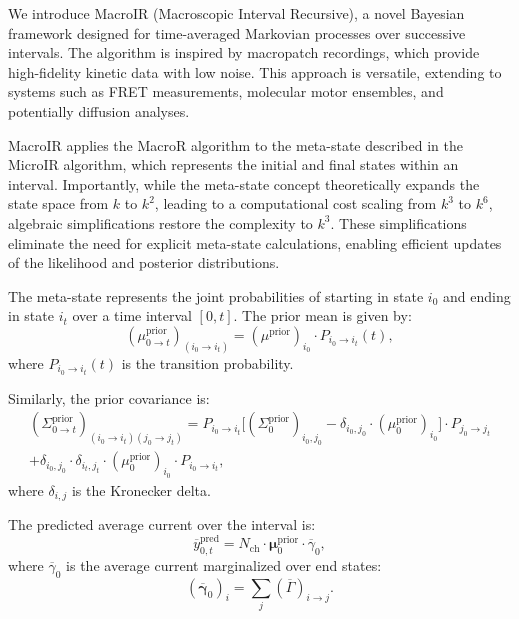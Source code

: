 \documentclass[pdflatex,sn-mathphys-num]{sn-jnl}%
\theoremstyle{thmstyleone}%
\theoremstyle{thmstyletwo}%
\theoremstyle{thmstylethree}%
\begin{document}
We introduce MacroIR (Macroscopic Interval Recursive), a novel Bayesian framework designed for time-averaged Markovian processes over successive intervals. The algorithm is inspired by macropatch recordings, which provide high-fidelity kinetic data with low noise. This approach is versatile, extending to systems such as FRET measurements, molecular motor ensembles, and potentially diffusion analyses.

MacroIR applies the MacroR algorithm to the meta-state described in the MicroIR algorithm, which represents the initial and final states within an interval. Importantly, while the meta-state concept theoretically expands the state space from \( k \) to \( k^2 \), leading to a computational cost scaling from \( k^3 \) to \( k^6 \), algebraic simplifications restore the complexity to \( k^3 \). These simplifications eliminate the need for explicit meta-state calculations, enabling efficient updates of the likelihood and posterior distributions.

The meta-state represents the joint probabilities of starting in state \( i_0 \) and ending in state \( i_t \) over a time interval \( [0, t] \). The prior mean is given by:
\begin{equation}
	(\mu^{\text{prior}}_{0 \rightarrow t})_{(i_0 \rightarrow i_t)} = (\mu^{\text{prior}})_{i_0} \cdot P_{i_0 \rightarrow i_t}(t),
	\label{eq:meta_mean_prior}
\end{equation}
where \( P_{i_0 \rightarrow i_t}(t) \) is the transition probability.

Similarly, the prior covariance is:
\begin{multline}
	(\Sigma^{\text{prior}}_{0 \rightarrow t})_{(i_0 \rightarrow i_t)(j_0 \rightarrow j_t)} = 
	P_{i_0 \rightarrow i_t} \big[(\Sigma^{\text{prior}}_0)_{i_0, j_0} - \delta_{i_0, j_0} \cdot (\mu^{\text{prior}}_0)_{i_0} \big] \cdot P_{j_0 \rightarrow j_t} \\
	+ \delta_{i_0, j_0} \cdot \delta_{i_t, j_t} \cdot (\mu^{\text{prior}}_0)_{i_0} \cdot P_{i_0 \rightarrow i_t},
	\label{eq:meta_covariance_prior}
\end{multline}
where \( \delta_{i, j} \) is the Kronecker delta.

The predicted average current over the interval is:
\begin{equation}
	\overline{y}^{\text{pred}}_{0,t} = N_{\text{ch}} \cdot \mathbf{\mu}^{\text{prior}}_{0} \cdot \overline{\gamma}_{0},
	\label{eq:macro_interval_predicted_y}
\end{equation}
where \( \overline{\gamma}_{0} \) is the average current marginalized over end states:
\begin{equation}
	(\overline{\mathbf{\gamma}}_{0})_i = \sum_j (\overline{\Gamma})_{i \rightarrow j}.
\end{equation}
\end{document}
